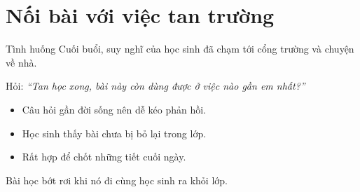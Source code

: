 \section{Nối bài với việc tan trường}
\begin{tinhhuong}{Tình huống}
Cuối buổi, suy nghĩ của học sinh đã chạm tới cổng trường và chuyện về nhà.
\end{tinhhuong}
\begin{goiydungngay}
Hỏi: \textit{``Tan học xong, bài này còn dùng được ở việc nào gần em nhất?''}
\begin{itemize}
\item Câu hỏi gần đời sống nên dễ kéo phản hồi.
\item Học sinh thấy bài chưa bị bỏ lại trong lớp.
\item Rất hợp để chốt những tiết cuối ngày.
\end{itemize}
\end{goiydungngay}
\begin{cauchot}
Bài học bớt rơi khi nó đi cùng học sinh ra khỏi lớp.
\end{cauchot}

